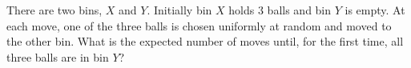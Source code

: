 There are two bins, $X$ and $Y$. Initially bin $X$ holds $3$ balls and bin $Y$ is empty. At each move, one of the three balls is chosen uniformly at random and moved to the other bin. What is the expected number of moves until, for the first time, all three balls are in bin $Y$?
